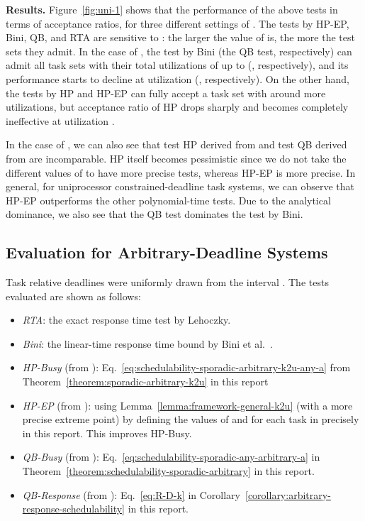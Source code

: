 \documentclass[10pt,conference]{IEEEtran}
\newcommand{\frameworkkq}[1]{}
\newcommand{\frameworkku}[1]{}
\begin{document}
\vspace{0.1in}
{\noindent \bf Results.}
Figure~\ref{fig:uni-1} shows that the performance of the above tests in terms of acceptance ratios, for three different settings of .
The tests by HP-EP, Bini, QB, and RTA are sensitive to : the larger the value of  is, the more the test sets they admit. In the case of , the test by Bini (the QB test, respectively) can admit all task sets with their total utilizations of up to  (, respectively), and its performance starts to decline at utilization  (, respectively). On the other hand, the tests by HP and HP-EP can fully accept a task set with around  more utilizations, but acceptance ratio of HP drops sharply and becomes completely ineffective at utilization . 

In the case of , we can also see that test HP derived from
\frameworkku{} and test QB derived from \frameworkkq{} are
incomparable. HP itself becomes pessimistic since we do not take the
different values of  to have more precise tests, whereas
HP-EP is more precise. In general, for
uniprocessor constrained-deadline task systems, we can observe that
HP-EP outperforms the other polynomial-time tests.  Due to the
analytical dominance, we also see that the QB test dominates the test
by Bini.



\subsection{Evaluation for Arbitrary-Deadline Systems}

Task relative deadlines were uniformly drawn from the interval .  
The tests evaluated are shown as follows:
\begin{itemize}
\item \emph{RTA}: the exact response time test by Lehoczky\cite{DBLP:conf/rtss/Lehoczky90}.
\item \emph{Bini}: the linear-time response time bound by Bini et al.~\cite{bini2009response}.
\item \emph{HP-Busy} (from \frameworkku{}): Eq.~\eqref{eq:schedulability-sporadic-arbitrary-k2u-any-a} from Theorem~\ref{theorem:sporadic-arbitrary-k2u}  in this report
\item \emph{HP-EP} (from \frameworkku{}): using Lemma~\ref{lemma:framework-general-k2u}
  (with a more precise extreme point) by defining the values of
   and  for each task  in 
  precisely in this report. This improves HP-Busy. 
\item \emph{QB-Busy} (from \frameworkkq{}): Eq.~\eqref{eq:schedulability-sporadic-any-arbitrary-a} in Theorem~\ref{theorem:schedulability-sporadic-arbitrary} in this report.
\item \emph{QB-Response} (from \frameworkkq{}): Eq.~\eqref{eq:R-D-k} in Corollary~\ref{corollary:arbitrary-response-schedulability} in this report.
\end{itemize}
\end{document}
